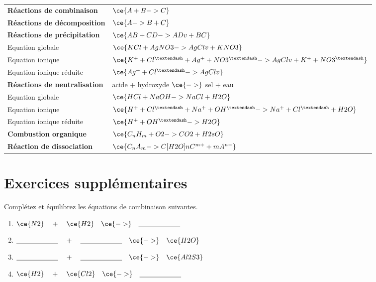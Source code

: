 \documentclass[
  11pt,
  a4paper,
  openany]{book}
\begin{document}
\begin{longtable}[]{@{}
  >{\raggedright\arraybackslash}p{}
  >{\raggedright\arraybackslash}p{}@{}}
\toprule()
\endhead
\textbf{Réactions de combinaison} & \(\ce{A + B -> C}\) \\
\textbf{Réactions de décomposition} & \(\ce{A -> B + C}\) \\
\textbf{Réactions de précipitation} & \(\ce{AB + CD -> AD v + BC}\) \\
Equation globale & \(\ce{KCl + AgNO3 -> AgCl v + KNO3}\) \\
Equation ionique & \(\ce{K^{+} + Cl^{–} + Ag^{+} + NO3^{–} -> AgCl v + K^{+} + NO3^{–}}\) \\
Equation ionique réduite & \(\ce{Ag^{+} + Cl^{–} -> AgCl v}\) \\
\textbf{Réactions de neutralisation} & acide + hydroxyde \(\ce{->}\) sel + eau \\
Equation globale & \(\ce{HCl + NaOH -> NaCl + H2O}\) \\
Equation ionique & \(\ce{H^{+} + Cl^{–} + Na^{+} + OH^{–} -> Na^{+} + Cl^{–} + H2O}\) \\
Equation ionique réduite & \(\ce{H^{+} + OH^{–} -> H2O}\) \\
\textbf{Combustion organique} & \(\ce{C_{n}H_{m} + O2 -> CO2 + H2sO}\) \\
\textbf{Réaction de dissociation} & \(\ce{C_{n}A_{m} ->C[H2O] n C^{m+} + m A^{n-}}\) \\
\bottomrule()
\end{longtable}

\newpage

\hypertarget{exercices-suppluxe9mentaires-9}{%
\section{Exercices supplémentaires}\label{exercices-suppluxe9mentaires-9}}

\begin{Exercise}

Complétez et équilibrez les équations de combinaison suivantes.

\begin{enumerate}
\def\labelenumi{\arabic{enumi}.}
\item
  \(\ce{N2} \quad + \quad \ce{H2} \quad \ce{->} \quad \underline{\hspace{6em}}\)
\item
  \(\underline{\hspace{6em}} \quad + \quad \underline{\hspace{6em}} \quad \ce{->} \quad \ce{H2O}\)
\item
  \(\underline{\hspace{6em}} \quad + \quad \underline{\hspace{6em}} \quad \ce{->} \quad \ce{Al2S3}\)
\item
  \(\ce{H2} \quad + \quad \ce{Cl2} \quad \ce{->} \quad \underline{\hspace{6em}}\)
\end{enumerate}

\end{Exercise}
\end{document}
